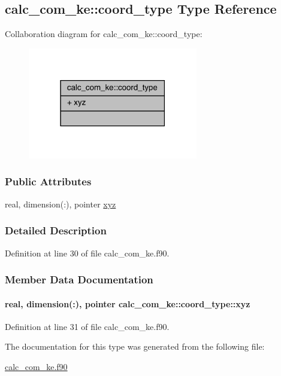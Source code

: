 \hypertarget{structcalc__com__ke_1_1coord__type}{\subsection{calc\-\_\-com\-\_\-ke\-:\-:coord\-\_\-type Type Reference}
\label{structcalc__com__ke_1_1coord__type}
}


Collaboration diagram for calc\-\_\-com\-\_\-ke\-:\-:coord\-\_\-type\-:
\nopagebreak
\begin{figure}[H]
\begin{center}
\leavevmode
\includegraphics[width=210pt]{structcalc__com__ke_1_1coord__type__coll__graph}
\end{center}
\end{figure}
\subsubsection*{Public Attributes}
\begin{DoxyCompactItemize}
\item 
real, dimension(\-:), pointer \hyperlink{structcalc__com__ke_1_1coord__type_aaab3fb30baf1f198f5fd346490f7e6c5}{xyz}
\end{DoxyCompactItemize}


\subsubsection{Detailed Description}


Definition at line 30 of file calc\-\_\-com\-\_\-ke.\-f90.



\subsubsection{Member Data Documentation}
\hypertarget{structcalc__com__ke_1_1coord__type_aaab3fb30baf1f198f5fd346490f7e6c5}{
\paragraph[{xyz}]{\setlength{\rightskip}{0pt plus 5cm}real, dimension(\-:), pointer calc\-\_\-com\-\_\-ke\-::coord\-\_\-type\-::xyz}}\label{structcalc__com__ke_1_1coord__type_aaab3fb30baf1f198f5fd346490f7e6c5}


Definition at line 31 of file calc\-\_\-com\-\_\-ke.\-f90.



The documentation for this type was generated from the following file\-:\begin{DoxyCompactItemize}
\item 
\hyperlink{calc__com__ke_8f90}{calc\-\_\-com\-\_\-ke.\-f90}\end{DoxyCompactItemize}
